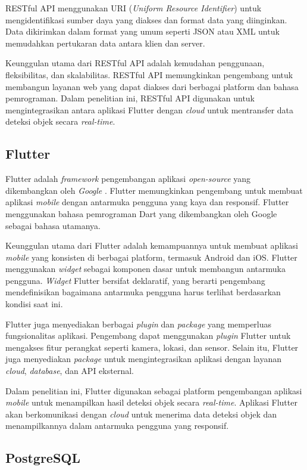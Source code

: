 RESTful API menggunakan URI (\emph{Uniform Resource Identifier}) untuk mengidentifikasi sumber daya yang diakses dan format data yang diinginkan. Data dikirimkan dalam format yang umum seperti JSON atau XML untuk memudahkan pertukaran data antara klien dan server. \parencite*{restapi2016}

Keunggulan utama dari RESTful API adalah kemudahan penggunaan, fleksibilitas, dan skalabilitas. RESTful API memungkinkan pengembang untuk membangun layanan web yang dapat diakses dari berbagai platform dan bahasa pemrograman. Dalam penelitian ini, RESTful API digunakan untuk mengintegrasikan antara aplikasi Flutter dengan \emph{cloud} untuk mentransfer data deteksi objek secara \emph{real-time}.

\subsection{Flutter}

Flutter adalah \emph{framework} pengembangan aplikasi \emph{open-source} yang dikembangkan oleh \emph{Google} \parencite*{google2024}. Flutter memungkinkan pengembang untuk membuat aplikasi \emph{mobile} dengan antarmuka pengguna yang kaya dan responsif. Flutter menggunakan bahasa pemrograman Dart yang dikembangkan oleh Google sebagai bahasa utamanya.

Keunggulan utama dari Flutter adalah kemampuannya untuk membuat aplikasi \emph{mobile} yang konsisten di berbagai platform, termasuk Android dan iOS. Flutter menggunakan \emph{widget} sebagai komponen dasar untuk membangun antarmuka pengguna. \emph{Widget} Flutter bersifat deklaratif, yang berarti pengembang mendefinisikan bagaimana antarmuka pengguna harus terlihat berdasarkan kondisi saat ini.

Flutter juga menyediakan berbagai \emph{plugin} dan \emph{package} yang memperluas fungsionalitas aplikasi. Pengembang dapat menggunakan \emph{plugin} Flutter untuk mengakses fitur perangkat seperti kamera, lokasi, dan sensor. Selain itu, Flutter juga menyediakan \emph{package} untuk mengintegrasikan aplikasi dengan layanan \emph{cloud}, \emph{database}, dan API eksternal.

Dalam penelitian ini, Flutter digunakan sebagai platform pengembangan aplikasi \emph{mobile} untuk menampilkan hasil deteksi objek secara \emph{real-time}. Aplikasi Flutter akan berkomunikasi dengan \emph{cloud} untuk menerima data deteksi objek dan menampilkannya dalam antarmuka pengguna yang responsif.

\subsection{PostgreSQL}

